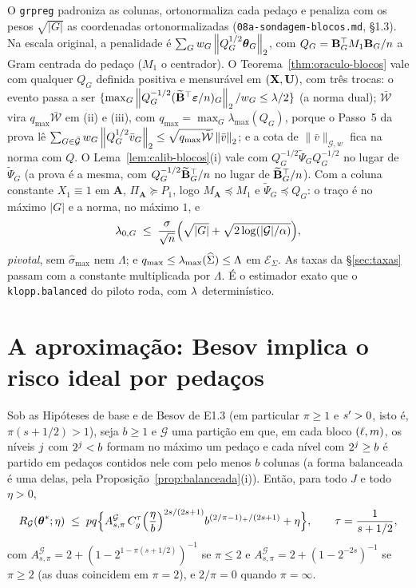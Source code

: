 \documentclass[11pt,a4paper]{article}
\newcommand{\lmaxx}{\lambda_{\max}}
\newcommand{\Amat}{\mathbf{A}}
\newcommand{\Bmat}{\mathbf{B}}
\newcommand{\Btil}{\widetilde{\Bmat}}
\newcommand{\PA}{\Pi_{\Amat}}
\newcommand{\MA}{M_{\Amat}}
\newcommand{\bveps}{\boldsymbol{\varepsilon}}
\newcommand{\smax}{\widehat{\sigma}_{\max}}
\newcommand{\vbar}{\bar{v}}
\newcommand{\Gcal}{\mathcal{G}}
\newcommand{\Gbar}{\bar{\mathcal{G}}}
\newcommand{\nGw}[1]{\lVert #1\rVert_{\mathcal{G},w}}
\newcommand{\Psitil}{\widetilde{\Psi}}
\newcommand{\Rid}{R_{\mathcal{G}}}
\newcommand{\lamz}[1]{\lambda_{0,#1}}
\newcommand{\ESig}{\mathcal{E}_{\Sigma}}
\newcommand{\AG}{A^{\mathcal{G}}_{s,\pi}}
\begin{document}
\begin{remark}
\label{rem:branca}
O \texttt{grpreg} padroniza as colunas, ortonormaliza cada pedaço e penaliza
com os pesos $\sqrt{|G|}$ as coordenadas ortonormalizadas
(\texttt{08a-sondagem-blocos.md}, §1.3). Na escala original, a penalidade é
$\sum_{G}w_{G}\left\lVert Q_{G}^{1/2}\boldsymbol{\theta}_{G} \right\rVert_{2}$, com $Q_{G} =
\Bmat_{G}\T M_{1}\Bmat_{G}/n$ a Gram centrada do pedaço ($M_{1}$ o centrador).
O Teorema~\ref{thm:oraculo-blocos} vale com qualquer $Q_{G}$ definida positiva
e mensurável em $(\mathbf{X},\mathbf{U})$, com três trocas: o evento passa a ser
$\{\max_{G}\norm{Q_{G}^{-1/2}(\Btil\T\bveps/n)_{G}}_{2}/w_{G} \le \pen/2\}$ (a
norma dual); $\bar{\mathcal{W}}$ vira $q_{\max}\bar{\mathcal{W}}$ em (ii) e (iii), com
$q_{\max} = \max_{G}\lmaxx(Q_{G})$, porque o Passo~5 da prova lê
$\sum_{G\in\Gbar}w_{G}\norm{Q_{G}^{1/2}\vbar_{G}}_{2} \le
\sqrt{q_{\max}\bar{\mathcal{W}}}\norm{\vbar}_{2}$; e a cota de $\nGw{\vbar}$ fica na
norma com $Q$. O Lema~\ref{lem:calib-blocos}(i) vale com
$Q_{G}^{-1/2}\Psitil_{G}Q_{G}^{-1/2}$ no lugar de $\Psitil_{G}$ (a prova é a
mesma, com $Q_{G}^{-1/2}\Btil_{G}\T/n$ no lugar de $\Btil_{G}\T/n$). Com a
coluna constante $X_{1}\equiv 1$ em $\Amat$, $\PA \succeq P_{1}$, logo
$\MA \preceq M_{1}$ e $\Psitil_{G} \preceq Q_{G}$: o traço é no máximo $|G|$
e a norma, no máximo $1$, e
\[
  \lamz{G} \;\le\; \frac{\sigma}{\sqrt n}\Bigl(\sqrt{|G|} + \sqrt{2\log(|\Gcal|/\alpha)}\Bigr),
\]
\emph{pivotal}, sem $\smax$ nem $\Lambda$; e $q_{\max} \le \lmaxx(\Gramhat)
\le \Lambda$ em $\ESig$. As taxas da §\ref{sec:taxas} passam com a constante
multiplicada por $\Lambda$. É o estimador exato que o \texttt{klopp.balanced}
do piloto roda, com $\lambda$ determinístico.
\end{remark}

\section{A aproximação: Besov implica o risco ideal por pedaços}

\begin{lemma}\label{lem:risco-pedacos}
Sob as Hipóteses de base e de Besov de E1.3 (em particular $\pi \ge 1$ e
$s' > 0$, isto é, $\pi(s+1/2) > 1$), seja $b \ge 1$ e $\Gcal$ uma partição
em que, em cada bloco $(\ell,m)$, os níveis $j$ com $2^{j} < b$ formam
no máximo um pedaço e cada nível com $2^{j} \ge b$ é partido em pedaços
contidos nele com pelo menos $b$ colunas (a forma balanceada é uma delas,
pela Proposição~\ref{prop:balanceada}(i)). Então, para todo $J$ e todo
$\eta > 0$,
\begin{equation}
  \label{eq:risco-pedacos}
  \Rid(\thetastar;\eta) \;\le\; pq\Bigl\{\AG\,C_{g}^{\tau}
  \Bigl(\frac{\eta}{b}\Bigr)^{2s/(2s+1)} b^{(2/\pi-1)_{+}/(2s+1)} + \eta\Bigr\},
  \qquad \tau = \frac{1}{s+1/2},
\end{equation}
com $\AG = 2 + (1 - 2^{1-\pi(s+1/2)})^{-1}$ se $\pi \le 2$ e
$\AG = 2 + (1 - 2^{-2s})^{-1}$ se $\pi \ge 2$ (as duas coincidem em
$\pi = 2$), e $2/\pi = 0$ quando $\pi = \infty$.
\end{lemma}
\end{document}
